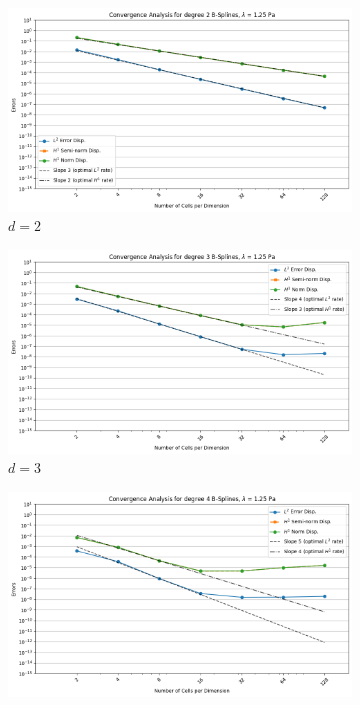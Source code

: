 \documentclass[a4paper,12pt,twoside]{report}
\begin{document}
\begin{figure}[!h]
	\centering
	\begin{subfigure}[b]{0.49\textwidth}
		\centering
		\includegraphics[width=\textwidth]{figures/figures_non_mixed/convergence_plot_degree_2_lambda=1.25.png}
		\caption{$d=2$}
		\label{fig:deg2_NM}
	\end{subfigure}
	\begin{subfigure}[b]{0.49\textwidth}
		\centering
		\includegraphics[width=\textwidth]{figures/figures_non_mixed/convergence_plot_degree_3_lambda=1.25.png}
		\caption{$d=3$}
		\label{fig:deg3_NM}
	\end{subfigure}
	\begin{subfigure}[b]{0.49\textwidth}
		\centering
		\includegraphics[width=\textwidth]{figures/figures_non_mixed/convergence_plot_degree_4_lambda=1.25.png}

\end{subfigure}
\end{figure}
\end{document}
